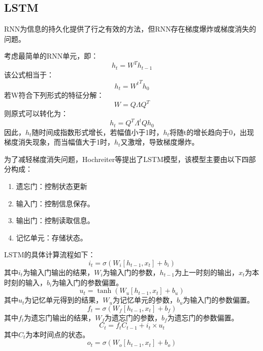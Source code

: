 \subsection{LSTM}
RNN为信息的持久化提供了行之有效的方法，但RNN存在梯度爆炸或梯度消失的问题。\par
考虑最简单的RNN单元，即：
\begin{equation}
h_t = W^Th_{t-1}
\end{equation}
该公式相当于：
\begin{equation}
h_t = {W^t}^Th_0
\end{equation}
若W符合下列形式的特征分解：
\begin{equation}
W=Q\Lambda Q^T
\end{equation}
则原式可以转化为：
\begin{equation}
h_t = Q^T\Lambda ^t Qh_0
\end{equation}
因此，$h_t$随时间成指数形式增长，若幅值小于1时，$h_t$将随t的增长趋向于0，出现梯度消失现象，而当幅值大于1时，$h_t$又激增，导致梯度爆炸。\par
为了减轻梯度消失问题，Hochreiter等\cite{lstm1997}提出了LSTM模型，该模型主要由以下四部分构成：
\begin{enumerate}
\item 遗忘门：控制状态更新
\item 输入门：控制信息保存。
\item 输出门：控制读取信息。
\item 记忆单元：存储状态。
\end{enumerate}
LSTM的具体计算流程如下：
\begin{equation}
i_t = \sigma(W_i  [h_{t-1},x_t] + b_i)
\end{equation}
其中$i_t$为输入门输出的结果，$W_i$为输入门的参数，$h_{t-1}$为上一时刻的输出，$x_t$为本时刻的输入，$b_i$为输入门的参数偏置。
\begin{equation}
u_t = \tanh{(W_u [h_{t-1},x_t] + b_u)}
\end{equation}
其中$u_t$为记忆单元得到的结果，$W_u$为记忆单元的参数，$b_u$为输入门的参数偏置。
\begin{equation}
f_t = \sigma{(W_f [h_{t-1},x_t] + b_f)}
\end{equation}
其中$f_t$为遗忘门输出的结果，$W_f$为遗忘门的参数，$b_f$为遗忘门的参数偏置。
\begin{equation}
C_t = f_t C_{t-1} + i_t \times u_t
\end{equation}
其中$C_t$为本时间点的状态。
\begin{equation}
o_t = \sigma{(W_o [h_{t-1},x_t] + b_o)}
\end{equation}
